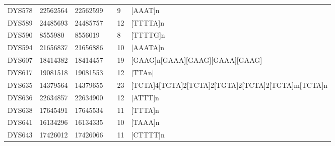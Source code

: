 \begin{tabularx}{\linewidth}{l l l l l l }
DYS578      & 22562564 & 22562599 &                        & 9  & {[}AAAT{]}n                                                                                                                          \\
DYS589      & 24485693 & 24485757 &                        & 12 & {[}TTTTA{]}n                                                                                                                         \\
DYS590      & 8555980  & 8556019  &                        & 8  & {[}TTTTG{]}n                                                                                                                         \\
DYS594      & 21656837 & 21656886 &                        & 10 & {[}AAATA{]}n                                                                                                                         \\
DYS607      & 18414382 & 18414457 &                        & 19 & {[}GAAG{]}n{[}GAAA{]}{[}GAAG{]}{[}GAAA{]}{[}GAAG{]}                                                                                  \\
DYS617      & 19081518 & 19081553 &                        & 12 & {[}TTAn{]}                                                                                                                           \\
DYS635      & 14379564 & 14379655 &                        & 23 & {[}TCTA{]}4{[}TGTA{]}2{[}TCTA{]}2{[}TGTA{]}2{[}TCTA{]}2{[}TGTA{]}m{[}TCTA{]}n                                                        \\
DYS636      & 22634857 & 22634900 &                        & 12 & {[}ATTT{]}n                                                                                                                          \\
DYS638      & 17645491 & 17645534 &                        & 11 & {[}TTTA{]}n                                                                                                                          \\
DYS641      & 16134296 & 16134335 &                        & 10 & {[}TAAA{]}n                                                                                                                          \\
DYS643      & 17426012 & 17426066 &                        & 11 & {[}CTTTT{]}n                                                                                                                         \\

\end{tabularx}
